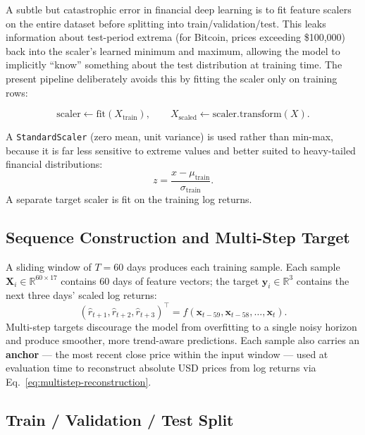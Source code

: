 \documentclass[12pt]{article}
\begin{document}
A subtle but catastrophic error in financial deep learning is to fit feature scalers on the entire dataset before splitting into train/validation/test. This leaks information about test-period extrema (for Bitcoin, prices exceeding \$100{,}000) back into the scaler's learned minimum and maximum, allowing the model to implicitly ``know'' something about the test distribution at training time. The present pipeline deliberately avoids this by fitting the scaler only on training rows:

\begin{equation}
    \mathrm{scaler} \leftarrow \mathrm{fit}\!\left(X_{\mathrm{train}}\right),\qquad X_{\mathrm{scaled}} \leftarrow \mathrm{scaler.transform}(X).
\end{equation}

A \texttt{StandardScaler} (zero mean, unit variance) is used rather than min-max, because it is far less sensitive to extreme values and better suited to heavy-tailed financial distributions:
\begin{equation}
    z = \frac{x - \mu_{\mathrm{train}}}{\sigma_{\mathrm{train}}}.
\end{equation}
A separate target scaler is fit on the training log returns.

\subsection{Sequence Construction and Multi-Step Target}

A sliding window of $T = 60$ days produces each training sample. Each sample $\mathbf{X}_i \in \mathbb{R}^{60 \times 17}$ contains 60 days of feature vectors; the target $\mathbf{y}_i \in \mathbb{R}^{3}$ contains the next three days' scaled log returns:
\begin{equation}
    \left(\hat{r}_{t+1}, \hat{r}_{t+2}, \hat{r}_{t+3}\right)^\top = f\!\left(\mathbf{x}_{t-59}, \mathbf{x}_{t-58}, \ldots, \mathbf{x}_{t}\right).
\end{equation}
Multi-step targets discourage the model from overfitting to a single noisy horizon and produce smoother, more trend-aware predictions. Each sample also carries an \textbf{anchor} --- the most recent close price within the input window --- used at evaluation time to reconstruct absolute USD prices from log returns via Eq.~\ref{eq:multistep-reconstruction}.

\subsection{Train / Validation / Test Split}
\end{document}
